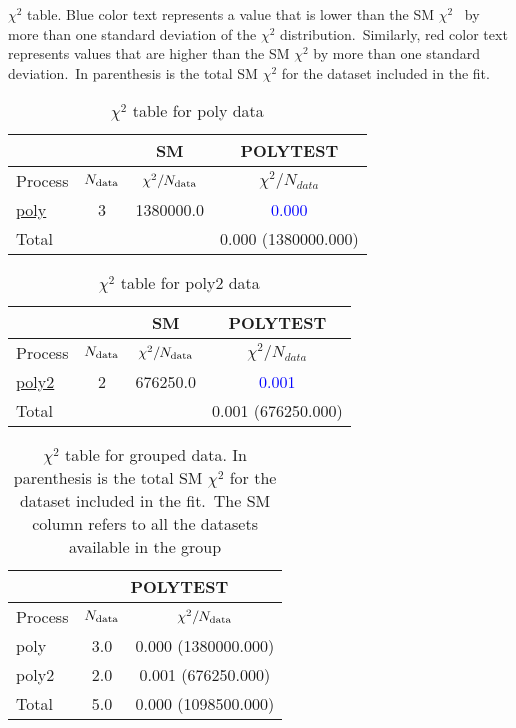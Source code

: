 \documentclass{article}
\begin{document}
$\chi^2$ table. Blue color text represents a value that is lower than the SM $\chi^2$ \
            by more than one standard deviation of the $\chi^2$ distribution.\
            Similarly, red color text represents values that are higher than the SM $\chi^2$ by more than one standard deviation.\
            In parenthesis is the total SM $\chi^2$ for the dataset included in the fit. \\
\begin{table}[H]
\centering
\begin{tabular}{|l|c|c|c|}
\hline
 \multicolumn{2}{|c|}{} & SM& POLYTEST\\ \hline
Process & $N_{\rm data}$ & $\chi^ 2/N_{\rm data}$& $\chi^ 2/N_{data}$\\ \hline
\href{https://arxiv.org}{poly} & 3 & 1380000.0 & \textcolor{blue}                            {0.000} \\ \hline
\hline Total & &  & 0.000 (1380000.000) \\ \hline
\end{tabular}
\caption{$\chi^2$ table for poly data}
\end{table}
\begin{table}[H]
\centering
\begin{tabular}{|l|c|c|c|}
\hline
 \multicolumn{2}{|c|}{} & SM& POLYTEST\\ \hline
Process & $N_{\rm data}$ & $\chi^ 2/N_{\rm data}$& $\chi^ 2/N_{data}$\\ \hline
\href{https://arxiv.org}{poly2} & 2 & 676250.0 & \textcolor{blue}                            {0.001} \\ \hline
\hline Total & &  & 0.001 (676250.000) \\ \hline
\end{tabular}
\caption{$\chi^2$ table for poly2 data}
\end{table}




\begin{table}[H]
\centering
\begin{tabular}{|l|c|c|}
\hline
& \multicolumn{2}{c|}{POLYTEST}\\ \hline
Process  & $N_{\rm data}$ & $\chi^2/N_{\rm data}$\\ \hline
poly & 3.0                         & 0.000                             (1380000.000) \\ \hline
poly2 & 2.0                         & 0.001                             (676250.000) \\ \hline
 \hline Total & 5.0                 & 0.000                     (1098500.000) \\ \hline
\end{tabular}
\caption{$\chi^2$ table for grouped data. In parenthesis is the total SM $\chi^2$ for the dataset included in the fit.\
                    The SM column refers to all the datasets available in the group}
\end{table}
\end{document}
